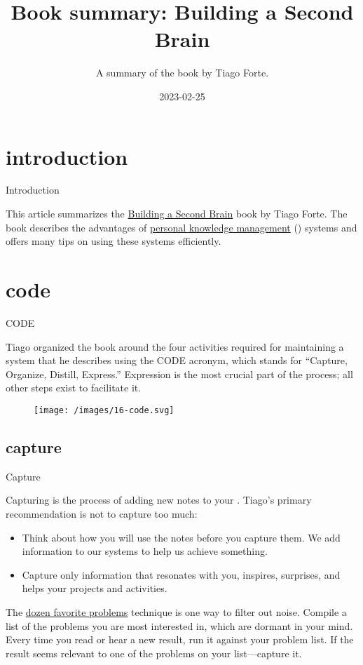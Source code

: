 \documentclass{article}
\title{Book summary: Building a Second Brain}
\subtitle{A summary of the book by Tiago Forte.}
\date{2023-02-25}
\begin{document}
\section{introduction}{Introduction}

This article summarizes the \href{https://www.buildingasecondbrain.com/}{Building a Second Brain} book by Tiago Forte.
The book describes the advantages of \href{https://en.wikipedia.org/wiki/Personal_knowledge_management}{personal knowledge management} () systems and offers many tips on using these systems efficiently.

\section{code}{CODE}

Tiago organized the book around the four activities required for maintaining a  system that he describes using the CODE acronym, which stands for ``Capture, Organize, Distill, Express.''
Expression is the most crucial part of the process; all other steps exist to facilitate it.

\begin{figure}[grayscale-diagram]
  \texttt{[image: /images/16-code.svg]}
\end{figure}

\subsection{capture}{Capture}

Capturing is the process of adding new notes to your .
Tiago's primary recommendation is not to capture too much:

\begin{itemize}
  \item Think about how you will use the notes before you capture them. We add information to our systems to help us achieve something.
  \item
    Capture only information that resonates with you, inspires, surprises, and helps your projects and activities.
\end{itemize}

The \href{https://fortelabs.com/blog/12-favorite-problems-how-to-spark-genius-with-the-power-of-open-questions/}{dozen favorite problems} technique is one way to filter out noise.
Compile a list of the problems you are most interested in, which are dormant in your mind.
Every time you read or hear a new result, run it against your problem list.
If the result seems relevant to one of the problems on your list---capture it.
\end{document}
